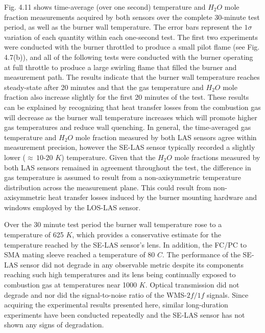 Fig. 4.11 shows time-average (over one second) temperature and $H_2O$ mole fraction measurements acquired by both sensors over the complete 30-minute test period, as well as the burner wall temperature. The error bars represent the $1\sigma$ variation of each quantity within each one-second test. The first two experiments were conducted with the burner throttled to produce a small pilot flame (see Fig. 4.7(b)), and all of the following tests were conducted with the burner operating at full throttle to produce a large swirling flame that filled the burner and measurement path. The results indicate that the burner wall temperature reaches steady-state after 20 minutes and that the gas temperature and $H_2O$ mole fraction also increase slightly for the first 20 minutes of the test. These results can be explained by recognizing that heat transfer losses from the combustion gas will decrease as the burner wall temperature increases which will promote higher gas temperatures and reduce wall quenching. In general, the time-averaged gas temperature and $H_2O$ mole fraction measured by both LAS sensors agree within measurement precision, however the SE-LAS sensor typically recorded a slightly lower ($\approx \,10$-$20$ $K$) temperature. Given that the $H_2O$ mole fractions measured by both LAS sensors remained in agreement throughout the test, the difference in gas temperature is assumed to result from a non-axisymmetric temperature distribution across the measurement plane. This could result from non-axisymmetric heat transfer losses induced by the burner mounting hardware and windows employed by the LOS-LAS sensor.

Over the 30 minute test period the burner wall temperature rose to a temperature of 625 $K$, which provides a conservative estimate for the temperature reached by the SE-LAS sensor’s lens. In addition, the FC/PC to SMA mating sleeve reached a temperature of 80 $C$. The performance of the SE-LAS sensor did not degrade in any observable metric despite its components reaching such high temperatures and its lens being continually exposed to combustion gas at temperatures near 1000 $K$. Optical transmission did not degrade and nor did the signal-to-noise ratio of the WMS-$2f/1f$ signals. Since acquiring the experimental results presented here, similar long-duration experiments have been conducted repeatedly and the SE-LAS sensor has not shown any signs of degradation.
